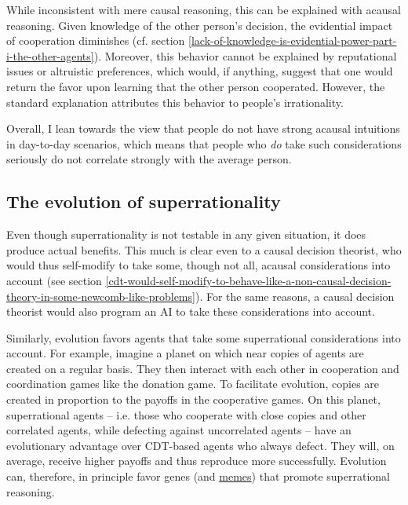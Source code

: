 While inconsistent with mere causal reasoning, this can be explained
with acausal reasoning. Given knowledge of the other person's decision,
the evidential impact of cooperation diminishes (cf. section
\ref{lack-of-knowledge-is-evidential-power-part-i-the-other-agents}).
Moreover, this behavior cannot be explained by reputational issues or
altruistic preferences, which would, if anything, suggest that one would
return the favor upon learning that the other person cooperated.
However, the standard explanation attributes this behavior to people's
irrationality.

Overall, I lean towards the view that people do not have strong acausal
intuitions in day-to-day scenarios, which means that people who
\emph{do} take such considerations seriously do not correlate strongly
with the average person.

\hypertarget{the-evolution-of-superrationality}{\subsection{The
evolution of superrationality}\label{the-evolution-of-superrationality}}

Even though superrationality is not testable in any given situation, it
does produce actual benefits. This much is clear even to a causal
decision theorist, who would thus self-modify to take some, though not
all, acausal considerations into account (see section
\ref{cdt-would-self-modify-to-behave-like-a-non-causal-decision-theory-in-some-newcomb-like-problems}). For the
same reasons, a causal decision theorist would also program an AI to
take these considerations into account.

Similarly, evolution favors agents that take some superrational
considerations into account. For example, imagine a planet on which near
copies of agents are created on a regular basis. They then interact with
each other in cooperation and coordination games like the donation game.
To facilitate evolution, copies are created in proportion to the payoffs
in the cooperative games. On this planet, superrational agents -- i.e.
those who cooperate with close copies and other correlated agents, while
defecting against uncorrelated agents -- have an evolutionary advantage
over CDT-based agents who always defect. They will, on average, receive
higher payoffs and thus reproduce more successfully. Evolution can,
therefore, in principle favor genes (and
\href{https://en.wikipedia.org/wiki/Meme}{memes}) that
promote superrational reasoning.

